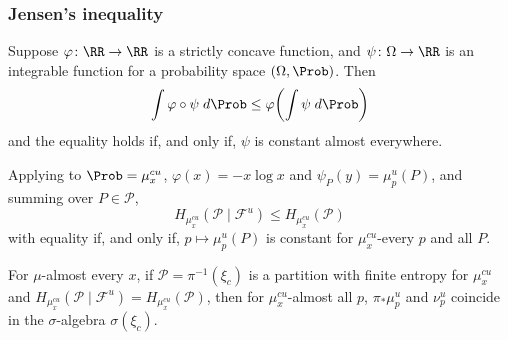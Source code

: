 \documentclass[shortlabels, 9pt, aspectratio=2013]{beamer}
\begin{document}
\begin{frame}
  \frametitle{Jensen's inequality}
  \begin{lemma}
    Suppose \(\varphi \colon \RR \to \RR\) is a strictly concave function, and \(\psi \colon \Omega \to \RR\) is an integrable function for a probability space \((\Omega,\Prob)\). Then
    \begin{equation*}
      \int \varphi \circ \psi \;d\Prob \le \varphi\rpar[\bigg]{\int \psi \;d\Prob}
    \end{equation*}
    and the equality holds if, and only if, \(\psi\) is constant almost everywhere.
  \end{lemma}
  Applying to \(\Prob = \mu_x^{cu}\), \(\varphi(x) = - x\log x\) and \(\psi_P(y) = \mu^u_p(P)\), and summing over \(P \in \mathcal{P}\),
  \begin{equation*}
    H_{\mu_x^{cu}}(\mathcal{P}\mid \mathcal{F}^u)\le H_{\mu_x^{cu}}(\mathcal{P})
  \end{equation*}
  with equality if, and only if, \(p \mapsto \mu^u_p(P)\) is constant for \(\mu_x^{cu}\)-every \(p\) and all \(P\).
  \begin{lemma}\label{lem:almost-there}
    For \(\mu\)-almost every \(x\), if \(\mathcal{P} = \pi ^{-1}(\xi_c)\) is a partition with finite entropy for \(\mu^{cu}_x\) and \(H_{\mu_x^{cu}}(\mathcal{P}\mid \mathcal{F}^u) = H_{\mu_x^{cu}}(\mathcal{P})\), then for \(\mu^{cu}_x\)-almost all \(p\), \(\pi_*\mu^u_p\) and \(\nu^u_p\) coincide in the \(\sigma\)-algebra \(\sigma(\xi_c)\).
  \end{lemma}
\end{frame}
\end{document}
